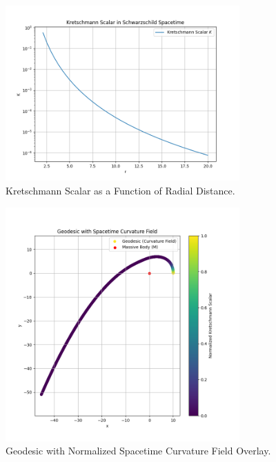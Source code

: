 \documentclass[12pt]{article}
\begin{document}
\begin{figure}[h]
    \centering
    \includegraphics[width=0.8\textwidth]{kretschmann_scalar.png}
    \caption{Kretschmann Scalar as a Function of Radial Distance.}
    \label{fig:kretschmann_scalar}
\end{figure}

\begin{figure}[h]
    \centering
    \includegraphics[width=0.8\textwidth]{geodesic_curvature_field.png}
    \caption{Geodesic with Normalized Spacetime Curvature Field Overlay.}
    \label{fig:curvature_field}
\end{figure}
\end{document}
